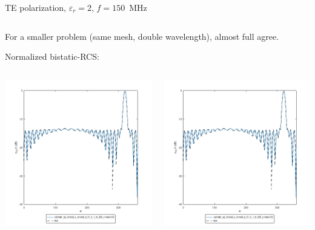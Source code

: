 \begin{frame}{TE polarization, $\varepsilon_r=2$, $f=150$\, MHz}
\begin{columns}
\end{columns}

\vbs

For a smaller problem (same mesh, double wavelength), almost full agree.

Normalized bistatic-RCS:

\vbss

\begin{columns}

\includegraphics[width=\linewidth]{results/FF/cylD_01_H_1_M_025_X/epr2_TE_f150_norm.png}


\includegraphics[width=\linewidth]{results/FF/cylD_01_H_1_M_025_Y/epr2_TE_f150_norm.png}


\end{columns}
\end{frame}

